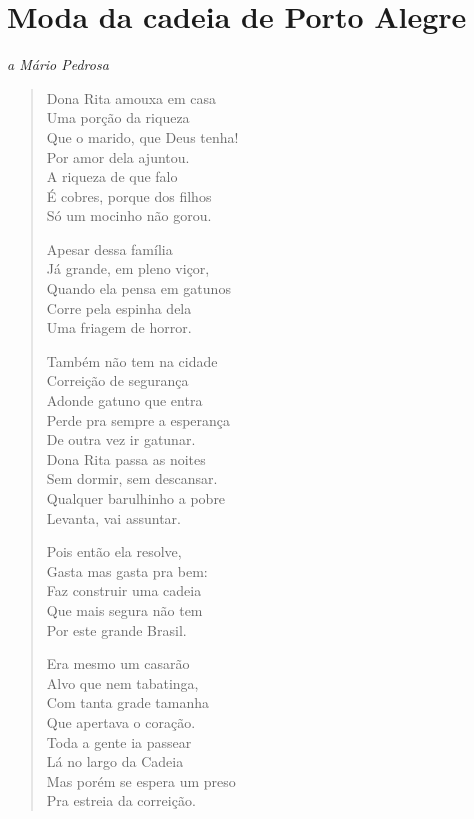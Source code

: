 {\chapter{Moda da cadeia de Porto Alegre}

\begin{flushright}
\emph{a Mário Pedrosa}
\end{flushright}

\begin{verse}
Dona Rita amouxa em casa\\
Uma porção da riqueza\\
Que o marido, que Deus tenha!\\
Por amor dela ajuntou.\\
A riqueza de que falo\\
É cobres, porque dos filhos\\
Só um mocinho não gorou.

Apesar dessa família\\
Já grande, em pleno viçor,\\
Quando ela pensa em gatunos\\
Corre pela espinha dela\\
Uma friagem de horror.

Também não tem na cidade\\
Correição de segurança\\
Adonde gatuno que entra\\
Perde pra sempre a esperança\\
De outra vez ir gatunar.\\
Dona Rita passa as noites\\
Sem dormir, sem descansar.\\
Qualquer barulhinho a pobre\\
Levanta, vai assuntar.

Pois então ela resolve,\\
Gasta mas gasta pra bem:\\
Faz construir uma cadeia\\
Que mais segura não tem\\
Por este grande Brasil.

Era mesmo um casarão\\
Alvo que nem tabatinga,\\
Com tanta grade tamanha\\
Que apertava o coração.\\
Toda a gente ia passear\\
Lá no largo da Cadeia\\
Mas porém se espera um preso\\
Pra estreia da correição.


\end{verse}}
